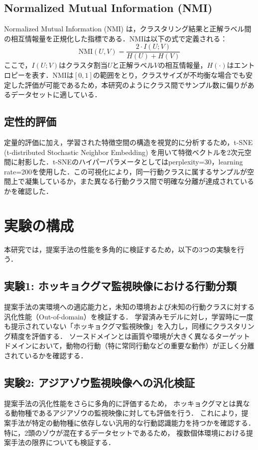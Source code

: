 \subsection{Normalized Mutual Information (NMI)}
Normalized Mutual Information (NMI) は，クラスタリング結果と正解ラベル間の相互情報量を正規化した指標である．NMIは以下の式で定義される：
\begin{equation}
  \mathrm{NMI}(U, V) = \frac{2 \cdot I(U; V)}{H(U) + H(V)}
\end{equation}
ここで，$I(U; V)$はクラスタ割当$U$と正解ラベル$V$の相互情報量，$H(\cdot)$はエントロピーを表す．NMIは$[0, 1]$の範囲をとり，クラスサイズが不均衡な場合でも安定した評価が可能であるため，本研究のようにクラス間でサンプル数に偏りがあるデータセットに適している．

\subsection{定性的評価}
定量的評価に加え，学習された特徴空間の構造を視覚的に分析するため，t-SNE (t-distributed Stochastic Neighbor Embedding) \cite{van2008visualizing} を用いて特徴ベクトルを2次元空間に射影した．t-SNEのハイパーパラメータとしてはperplexity=30，learning rate=200を使用した．この可視化により，同一行動クラスに属するサンプルが空間上で凝集しているか，また異なる行動クラス間で明確な分離が達成されているかを確認した．


\section{実験の構成}
本研究では，提案手法の性能を多角的に検証するため，以下の3つの実験を行う．

\subsection{実験1: ホッキョクグマ監視映像における行動分類}
提案手法の実環境への適応能力と，未知の環境および未知の行動クラスに対する汎化性能（Out-of-domain）を検証する．
学習済みモデルに対し，学習時に一度も提示されていない「ホッキョクグマ監視映像」を入力し，同様にクラスタリング精度を評価する．
ソースドメインとは画質や環境が大きく異なるターゲットドメインにおいて，動物の行動（特に常同行動などの重要な動作）が正しく分離されているかを確認する．

\subsection{実験2: アジアゾウ監視映像への汎化検証}
提案手法の汎化性能をさらに多角的に評価するため，
ホッキョクグマとは異なる動物種であるアジアゾウの監視映像に対しても評価を行う．
これにより，提案手法が特定の動物種に依存しない汎用的な行動認識能力を持つかを確認する．
特に，2頭のゾウが混在するデータセットであるため，
複数個体環境における提案手法の限界についても検証する．


